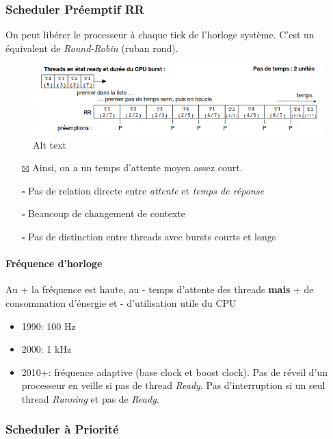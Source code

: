 \subsubsection{Scheduler Préemptif RR}\label{scheduler-pruxe9emptif-rr}

On peut libérer le processeur à chaque tick de l'horloge système. C'est
un équivalent de \emph{Round-Robin} (ruban rond).

\begin{figure}
\centering
\includegraphics{image-32.png}
\caption{Alt text}
\end{figure}

\begin{itemize}
\tightlist
\item[$\boxtimes$]
  Ainsi, on a un temps d'attente moyen assez court.
\item[$\square$]
  Pas de relation directe entre \emph{attente} et \emph{temps de
  réponse}
\item[$\square$]
  Beaucoup de changement de contexte
\item[$\square$]
  Pas de distinction entre threads avec bursts courts et longs
\end{itemize}

\paragraph{Fréquence d'horloge}\label{fruxe9quence-dhorloge}

Au + la fréquence est haute, au - temps d'attente des threads
\textbf{mais} + de consommation d'énergie et - d'utilisation utile du
CPU

\begin{itemize}
\tightlist
\item
  1990: 100 Hz
\item
  2000: 1 kHz
\item
  2010+: fréquence adaptive (base clock et boost clock). Pas de réveil
  d'un processeur en veille si pas de thread \emph{Ready}. Pas
  d'interruption si un seul thread \emph{Running} et pas de
  \emph{Ready}.
\end{itemize}

\subsubsection{Scheduler à Priorité}\label{scheduler-uxe0-priorituxe9}

